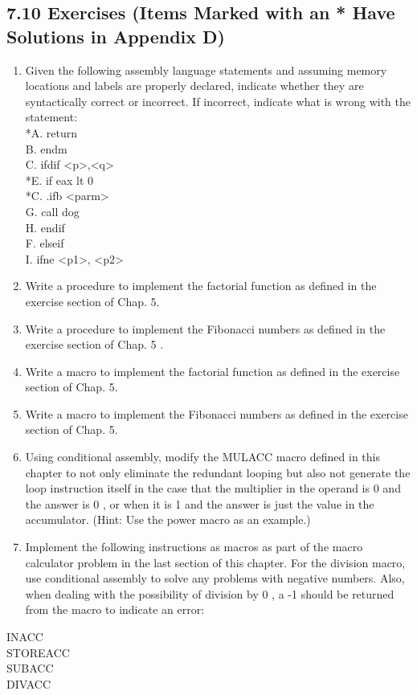 \documentclass[10pt]{book}
\begin{document}
\begin{center}
\begin{center}
\subsection*{7.10 Exercises (Items Marked with an * Have Solutions in Appendix D)}
\begin{enumerate}
  \item Given the following assembly language statements and assuming memory locations and labels are properly declared, indicate whether they are syntactically correct or incorrect. If incorrect, indicate what is wrong with the statement:\\
*A. return\\
B. endm\\
C. ifdif <p>,<q>\\
*E. if eax lt 0\\
*C. .ifb <parm>\\
G. call dog\\
H. endif\\
F. elseif\\
I. ifne <p1>, <p2>
  \item Write a procedure to implement the factorial function as defined in the exercise section of Chap. 5.
  \item Write a procedure to implement the Fibonacci numbers as defined in the exercise section of Chap. 5 .
  \item Write a macro to implement the factorial function as defined in the exercise section of Chap. 5.
  \item Write a macro to implement the Fibonacci numbers as defined in the exercise section of Chap. 5.
  \item Using conditional assembly, modify the MULACC macro defined in this chapter to not only eliminate the redundant looping but also not generate the loop instruction itself in the case that the multiplier in the operand is 0 and the answer is 0 , or when it is 1 and the answer is just the value in the accumulator. (Hint: Use the power macro as an example.)
  \item Implement the following instructions as macros as part of the macro calculator problem in the last section of this chapter. For the division macro, use conditional assembly to solve any problems with negative numbers. Also, when dealing with the possibility of division by 0 , a -1 should be returned from the macro to indicate an error:
\end{enumerate}


INACC\\
STOREACC\\
SUBACC\\
DIVACC


\end{center}
\end{center}
\end{document}

